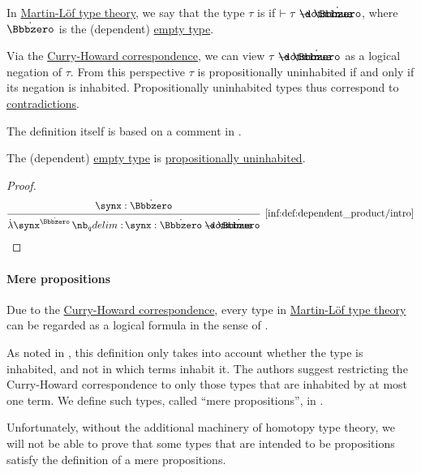 \begin{definition}\label{def:propositionally_uninhabited}\mimprovised
  In \hyperref[def:mltt]{Martin-L\"of type theory}, we say that the type \( \tau \) is  if \( \vdash \tau \synimplies \syn\Bbbzero \), where \( \syn\Bbbzero \) is the (dependent) \hyperref[def:dependent_empty_type]{empty type}.
\end{definition}
\begin{comments}
  \item Via the \hyperref[con:curry_howard_correspondence]{Curry-Howard correspondence}, we can view \( \tau \synimplies \syn\Bbbzero \) as a logical negation of \( \tau \). From this perspective \( \tau \) is propositionally uninhabited if and only if its negation is inhabited. Propositionally uninhabited types thus correspond to \hyperref[def:propositional_contradiction]{contradictions}.

  The definition itself is based on a comment in \cite[47]{UnivalentFoundationsProgram2024OctoberHoTT}.
\end{comments}

\begin{proposition}\label{thm:empty_type_is_uninhabited}
  The (dependent) \hyperref[def:dependent_empty_type]{empty type} is \hyperref[def:propositionally_uninhabited]{propositionally uninhabited}.
\end{proposition}
\begin{proof}
  \begin{equation*}
    \begin{prooftree}
      \hypo{ \synx: \syn\Bbbzero }
      \infer1[\ref{inf:def:dependent_product/intro}]{ \qabs {\synx^{\syn\Bbbzero}} \synx: \syn\Bbbzero \synimplies \syn\Bbbzero }.
    \end{prooftree}
  \end{equation*}
\end{proof}

\paragraph{Mere propositions}

\begin{remark}\label{rem:mere_propositions}
  Due to the \hyperref[con:curry_howard_correspondence]{Curry-Howard correspondence}, every type in \hyperref[def:mltt]{Martin-L\"of type theory} can be regarded as a logical formula in the sense of .

  As noted in \cite[111]{UnivalentFoundationsProgram2024OctoberHoTT}, this definition only takes into account whether the type is inhabited, and not in which terms inhabit it. The authors suggest restricting the Curry-Howard correspondence to only those types that are inhabited by at most one term. We define such types, called \enquote{mere propositions}, in .

  Unfortunately, without the additional machinery of homotopy type theory, we will not be able to prove that some types that are intended to be propositions satisfy the definition of a mere propositions.
\end{remark}

